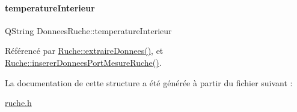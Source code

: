 \mbox{\label{struct_donnees_ruche_ad6cbda133d2c8abc23fb688d6e565ab2}} 
\paragraph{\texorpdfstring{temperature\+Interieur}{temperatureInterieur}}
{\footnotesize\ttfamily Q\+String Donnees\+Ruche\+::temperature\+Interieur}



Référencé par \hyperlink{class_ruche_a21c0dafeaec03d451590037343e6a3ca}{Ruche\+::extraire\+Donnees()}, et \hyperlink{class_ruche_aa61f6dd8b15e5242ef3a3bdd87cca4a3}{Ruche\+::inserer\+Donnees\+Port\+Mesure\+Ruche()}.



La documentation de cette structure a été générée à partir du fichier suivant \+:\begin{DoxyCompactItemize}
\item 
\hyperlink{ruche_8h}{ruche.\+h}\end{DoxyCompactItemize}
